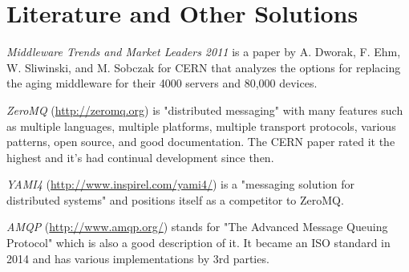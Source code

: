 \documentclass[10pt,journal,compsoc]{IEEEtran}
\begin{document}
\section{Literature and Other Solutions}


\emph{Middleware Trends and Market Leaders 2011}\cite{trends} is a paper by A. Dworak, F. Ehm, W. Sliwinski, and M. Sobczak for CERN that analyzes the options for replacing the aging middleware for their 4000 servers and 80,000 devices. 

\emph{ZeroMQ} (\url{http://zeromq.org}) is "distributed messaging" with many features such as multiple languages, multiple platforms, multiple transport protocols, various patterns, open source, and good documentation. The CERN paper rated it the highest and it's had continual development since then.

\emph{YAMI4} (\url{http://www.inspirel.com/yami4/}) is a "messaging solution for distributed systems" and positions itself as a competitor to ZeroMQ.

\emph{AMQP} (\url{http://www.amqp.org/}) stands for "The Advanced Message Queuing Protocol" which is also a good description of it. It became an ISO standard in 2014 and has various implementations by 3rd parties. 








%
\end{document}
